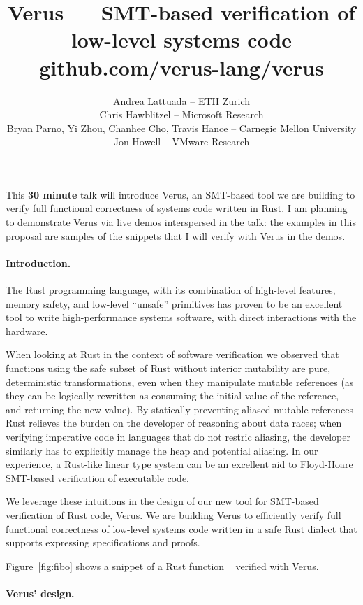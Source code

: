 \documentclass[11pt,twocolumn]{article}
\date{}
\title{Verus --- SMT-based verification of low-level systems code\\\small github.com/verus-lang/verus}
\author{Andrea Lattuada -- ETH Zurich \\
Chris Hawblitzel -- Microsoft Research \\
Bryan Parno, Yi Zhou, Chanhee Cho, Travis Hance -- Carnegie Mellon University \\
Jon Howell -- VMware Research}
\newcommand{\codesize}{\fontsize{8pt}{9pt}\selectfont}
\newcommand{\textcode}[1]{{\codesize\ttfamily{#1}}}
\renewcommand{\section}[1]{\paragraph{#1.}}
\newcommand*\circled[1]{\,\tikz[baseline=(char.base)]{
            \node[shape=circle,draw,inner sep=.7pt] (char) {\textcode{#1}};}\,}
\newcommand{\clref}[1]{\circled{\ref{#1}}}
\begin{document}
\maketitle

This \textbf{30 minute} talk will introduce Verus, an SMT-based tool we are building to
verify full functional correctness of systems code written in Rust. I am
planning to demonstrate Verus via live demos interspersed in the talk:
the examples in this proposal are samples of the snippets that I will
verify with Verus in the demos.

\section{Introduction}\label{introduction}

The Rust programming language, with its combination of high-level
features, memory safety, and low-level ``unsafe'' primitives has proven
to be an excellent tool to write high-performance systems software, with
direct interactions with the hardware.

When looking at Rust in the context of software verification
we observed that functions using the safe subset of Rust without
interior mutability are pure, deterministic transformations, even when
they manipulate mutable references (as they can be logically rewritten
as consuming the initial value of the reference, and returning the new
value). By statically preventing aliased mutable references Rust
relieves the burden on the developer of reasoning about data races; when
verifying imperative code in languages that do not restric aliasing, the
developer similarly has to explicitly manage the heap and potential
aliasing. In our experience, a Rust-like linear type system can be an
excellent aid to Floyd-Hoare SMT-based verification of executable code.

We leverage these intuitions in the design of our new tool for SMT-based
verification of Rust code, Verus.
We are building Verus to efficiently verify full functional correctness
of low-level systems code written in a safe Rust dialect that supports
expressing specifications and proofs.

Figure~\ref{fig:fibo} shows a snippet of a Rust
function~\clref{clnum:fn-fibo-impl} verified with Verus.

\section{Verus' design}\label{verus-design}
\end{document}
